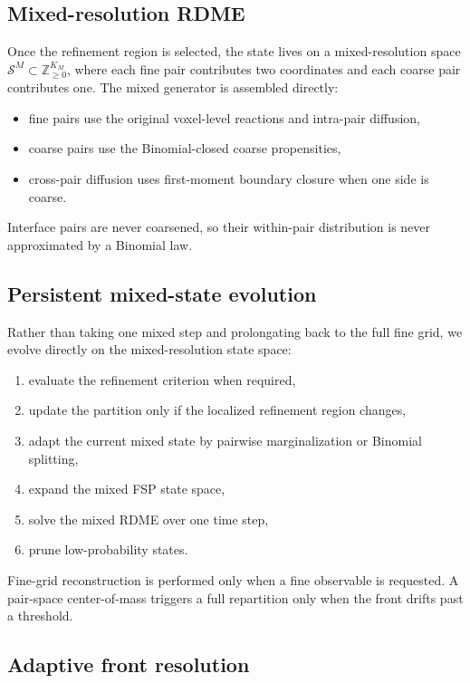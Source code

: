 \documentclass[11pt]{article}
\newcommand{\Sset}{\mathcal{S}}
\newcommand{\Znn}{\mathbb{Z}_{\ge 0}}
\begin{document}
\subsection{Mixed-resolution RDME}

Once the refinement region is selected, the state lives on a mixed-resolution
space $\Sset^M \subset \Znn^{K_M}$, where each fine pair contributes two
coordinates and each coarse pair contributes one. The mixed generator is
assembled directly:
\begin{itemize}[itemsep=0.2em]
  \item fine pairs use the original voxel-level reactions and intra-pair
        diffusion,
  \item coarse pairs use the Binomial-closed coarse propensities,
  \item cross-pair diffusion uses first-moment boundary closure when one side
        is coarse.
\end{itemize}
Interface pairs are never coarsened, so their within-pair distribution is never
approximated by a Binomial law.

\subsection{Persistent mixed-state evolution}

Rather than taking one mixed step and prolongating back to the full fine grid,
we evolve directly on the mixed-resolution state space:
\begin{enumerate}[itemsep=0.2em]
  \item evaluate the refinement criterion when required,
  \item update the partition only if the localized refinement region changes,
  \item adapt the current mixed state by pairwise marginalization or Binomial
        splitting,
  \item expand the mixed FSP state space,
  \item solve the mixed RDME over one time step,
  \item prune low-probability states.
\end{enumerate}
Fine-grid reconstruction is performed only when a fine observable is requested.
A pair-space center-of-mass triggers a full repartition only when the front
drifts past a threshold.

\subsection{Adaptive front resolution}
\end{document}
